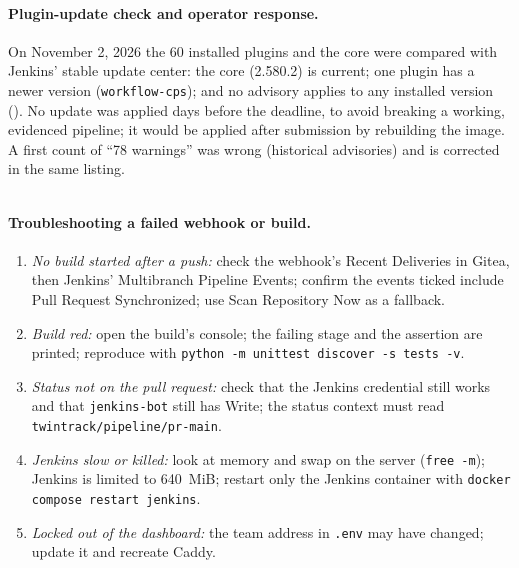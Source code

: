 \paragraph{Plugin-update check and operator response.} On November 2, 2026 the 60 installed plugins and the core were compared with Jenkins' stable update
center: the core (2.580.2) is current; one plugin has a newer version (\texttt{workflow-cps}); and no advisory applies to any installed version (). No update
was applied days before the deadline, to avoid breaking a working, evidenced pipeline; it would be applied after submission by rebuilding the image. A first count of ``78 warnings'' was wrong
(historical advisories) and is corrected in the same listing.

\begin{longlisting}
\inputminted[fontsize=\scriptsize]{text}{evidence/104-jenkins-plugin-and-core-update-check-2026-11-02.txt}
\caption{Plugin and core update check against the stable update center, November 2, 2026 (real output).}
\label{Listing:E104}
\end{longlisting}

\paragraph{Troubleshooting a failed webhook or build.}
\begin{enumerate}
\item \emph{No build started after a push:} check the webhook's Recent Deliveries in Gitea, then Jenkins' Multibranch Pipeline Events; confirm the events ticked include Pull Request Synchronized; use Scan Repository Now as a fallback.
\item \emph{Build red:} open the build's console; the failing stage and the assertion are printed; reproduce with \texttt{python -m unittest discover -s tests -v}.
\item \emph{Status not on the pull request:} check that the Jenkins credential still works and that \texttt{jenkins-bot} still has Write; the status context must read \texttt{twintrack/pipeline/pr-main}.
\item \emph{Jenkins slow or killed:} look at memory and swap on the server (\texttt{free -m}); Jenkins is limited to 640~MiB; restart only the Jenkins container with \texttt{docker compose restart jenkins}.
\item \emph{Locked out of the dashboard:} the team address in \texttt{.env} may have changed; update it and recreate Caddy.
\end{enumerate}

